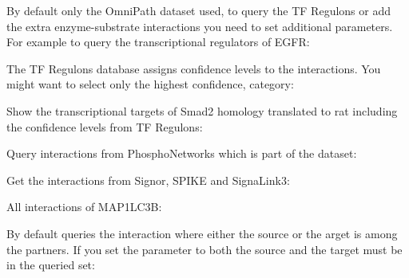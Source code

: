 \documentclass[letterpaper,10pt,english]{sphinxmanual}
\begin{document}
By default only the OmniPath dataset used, to query the TF Regulons or add the
extra enzyme-substrate interactions you need to set additional parameters. For
example to query the transcriptional regulators of EGFR:
\begin{quote}

\end{quote}

The TF Regulons database assigns confidence levels to the interactions. You
might want to select only the highest confidence,  category:
\begin{quote}

\end{quote}

Show the transcriptional targets of Smad2 homology translated to rat including
the confidence levels from TF Regulons:
\begin{quote}

\end{quote}

Query interactions from PhosphoNetworks which is part of the 
dataset:
\begin{quote}

\end{quote}

Get the interactions from Signor, SPIKE and SignaLink3:
\begin{quote}

\end{quote}

All interactions of MAP1LC3B:
\begin{quote}

\end{quote}

By default  queries the interaction where either the source or the
arget is among the partners. If you set the  parameter to
 both the source and the target must be in the queried set:
\begin{quote}

\end{quote}
\end{document}
